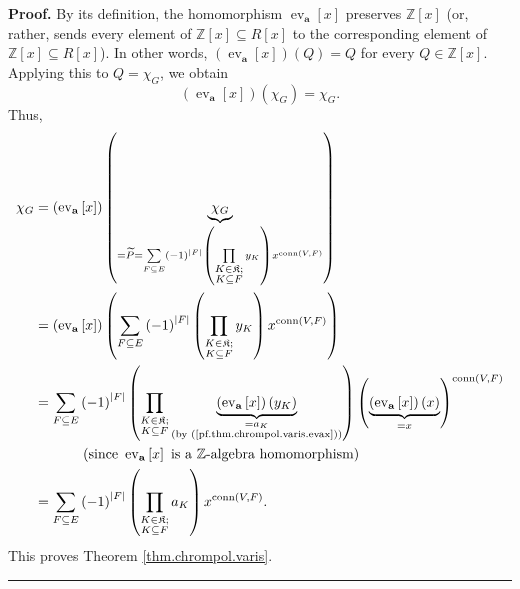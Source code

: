 \documentclass[numbers=enddot,12pt,final,onecolumn,notitlepage]{scrartcl}%
\theoremstyle{definition}
\newenvironment{proof}[1][Proof]{\noindent\textbf{#1.} }{\ \rule{0.5em}{0.5em}}
\newenvironment{verlong}{}{}
\let\sumnonlimits\sum
\let\prodnonlimits\prod
\renewcommand{\sum}{\sumnonlimits\limits}
\renewcommand{\prod}{\prodnonlimits\limits}
\begin{document}
\begin{verlong}
\begin{proof}
By its definition, the homomorphism $\operatorname*{ev}\nolimits_{\mathbf{a}%
}\left[  x\right]  $ preserves $\mathbb{Z}\left[  x\right]  $ (or, rather,
sends every element of $\mathbb{Z}\left[  x\right]  \subseteq R\left[
x\right]  $ to the corresponding element of $\mathbb{Z}\left[  x\right]
\subseteq R\left[  x\right]  $). In other words, $\left(  \operatorname*{ev}%
\nolimits_{\mathbf{a}}\left[  x\right]  \right)  \left(  Q\right)  =Q$ for
every $Q\in\mathbb{Z}\left[  x\right]  $. Applying this to $Q=\chi_{G}$, we
obtain%
\[
\left(  \operatorname*{ev}\nolimits_{\mathbf{a}}\left[  x\right]  \right)
\left(  \chi_{G}\right)  =\chi_{G}.
\]
Thus,%
\begin{align*}
\chi_{G}  &  =\left(  \operatorname*{ev}\nolimits_{\mathbf{a}}\left[
x\right]  \right)  \left(  \underbrace{\chi_{G}}_{=\widetilde{P}%
=\sum_{F\subseteq E}\left(  -1\right)  ^{\left\vert F\right\vert }\left(
\prod_{\substack{K\in\mathfrak{K};\\K\subseteq F}}y_{K}\right)
x^{\operatorname*{conn}\left(  V,F\right)  }}\right) \\
&  =\left(  \operatorname*{ev}\nolimits_{\mathbf{a}}\left[  x\right]  \right)
\left(  \sum_{F\subseteq E}\left(  -1\right)  ^{\left\vert F\right\vert
}\left(  \prod_{\substack{K\in\mathfrak{K};\\K\subseteq F}}y_{K}\right)
x^{\operatorname*{conn}\left(  V,F\right)  }\right) \\
&  =\sum_{F\subseteq E}\left(  -1\right)  ^{\left\vert F\right\vert }\left(
\prod_{\substack{K\in\mathfrak{K};\\K\subseteq F}}\underbrace{\left(
\operatorname*{ev}\nolimits_{\mathbf{a}}\left[  x\right]  \right)  \left(
y_{K}\right)  }_{\substack{=a_{K}\\\text{(by (\ref{pf.thm.chrompol.varis.evax}%
))}}}\right)  \left(  \underbrace{\left(  \operatorname*{ev}%
\nolimits_{\mathbf{a}}\left[  x\right]  \right)  \left(  x\right)  }%
_{=x}\right)  ^{\operatorname*{conn}\left(  V,F\right)  }\\
&  \ \ \ \ \ \ \ \ \ \ \left(  \text{since }\operatorname*{ev}%
\nolimits_{\mathbf{a}}\left[  x\right]  \text{ is a }\mathbb{Z}\text{-algebra
homomorphism}\right) \\
&  =\sum_{F\subseteq E}\left(  -1\right)  ^{\left\vert F\right\vert }\left(
\prod_{\substack{K\in\mathfrak{K};\\K\subseteq F}}a_{K}\right)
x^{\operatorname*{conn}\left(  V,F\right)  }.
\end{align*}
This proves Theorem \ref{thm.chrompol.varis}.
\end{proof}
\end{verlong}
\end{document}
